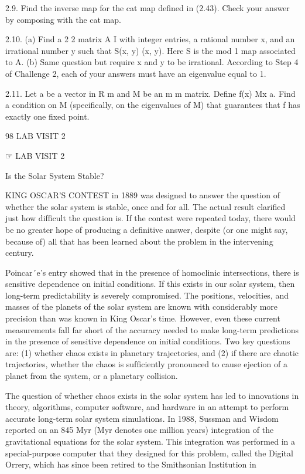 \documentclass[12pt]{article}
\begin{document}
{2.9. Find the inverse map for the cat map deﬁned in (2.43). Check your answer by composing with the cat map.

2.10. (a) Find a 2 2 matrix A  I with integer entries, a rational number x, and an irrational number y such that S(x, y)  (x, y). 
Here S is the mod 1 map associated to A. (b) Same question but require x and y to be irrational. According to Step 4 of Challenge 2, 
each of your answers must have an eigenvalue equal to 1.

2.11. Let a be a vector in R m and M be an m m matrix. Deﬁne f(x)  Mx  a. Find a condition on M (speciﬁcally, on the eigenvalues of 
M) that guarantees that f has exactly one ﬁxed point.

98 LAB VISIT 2

☞ LAB VISIT 2

Is the Solar System Stable?

KING OSCAR’S CONTEST in 1889 was designed to answer the question of whether the solar system is stable, once and for all. The actual 
result clariﬁed just how difﬁcult the question is. If the contest were repeated today, there would be no greater hope of producing 
a deﬁnitive answer, despite (or one might say, because of) all that has been learned about the problem in the intervening century.

Poincar´e’s entry showed that in the presence of homoclinic intersections, there is sensitive dependence on initial conditions. If 
this exists in our solar system, then long-term predictability is severely compromised. The positions, velocities, and masses of the 
planets of the solar system are known with considerably more precision than was known in King Oscar’s time. However, even these 
current measurements fall far short of the accuracy needed to make long-term predictions in the presence of sensitive dependence on 
initial conditions. Two key questions are: (1) whether chaos exists in planetary trajectories, and (2) if there are chaotic 
trajectories, whether the chaos is sufﬁciently pronounced to cause ejection of a planet from the system, or a planetary collision.

The question of whether chaos exists in the solar system has led to innovations in theory, algorithms, computer software, and 
hardware in an attempt to perform accurate long-term solar system simulations. In 1988, Sussman and Wisdom reported on an 845 Myr 
(Myr denotes one million years) integration of the gravitational equations for the solar system. This integration was performed in a 
special-purpose computer that they designed for this problem, called the Digital Orrery, which has since been retired to the 
Smithsonian Institution in

}
\end{document}
